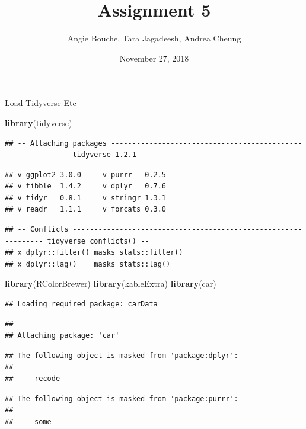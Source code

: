 \documentclass[]{article}
\title{Assignment 5}
\author{Angie Bouche, Tara Jagadeesh, Andrea Cheung}
\date{November 27, 2018}
\newenvironment{Shaded}{\begin{snugshade}}{\end{snugshade}}
\newcommand{\KeywordTok}[1]{\textcolor[rgb]{0.13,0.29,0.53}{\textbf{#1}}}
\newcommand{\NormalTok}[1]{#1}
\begin{document}
\maketitle

Load Tidyverse Etc

\begin{Shaded}
\begin{Highlighting}[]
\KeywordTok{library}\NormalTok{(tidyverse)}
\end{Highlighting}
\end{Shaded}

\begin{verbatim}
## -- Attaching packages ------------------------------------------------------------ tidyverse 1.2.1 --
\end{verbatim}

\begin{verbatim}
## v ggplot2 3.0.0     v purrr   0.2.5
## v tibble  1.4.2     v dplyr   0.7.6
## v tidyr   0.8.1     v stringr 1.3.1
## v readr   1.1.1     v forcats 0.3.0
\end{verbatim}

\begin{verbatim}
## -- Conflicts --------------------------------------------------------------- tidyverse_conflicts() --
## x dplyr::filter() masks stats::filter()
## x dplyr::lag()    masks stats::lag()
\end{verbatim}

\begin{Shaded}
\begin{Highlighting}[]
\KeywordTok{library}\NormalTok{(RColorBrewer)}
\KeywordTok{library}\NormalTok{(kableExtra)}
\KeywordTok{library}\NormalTok{(car)}
\end{Highlighting}
\end{Shaded}

\begin{verbatim}
## Loading required package: carData
\end{verbatim}

\begin{verbatim}
## 
## Attaching package: 'car'
\end{verbatim}

\begin{verbatim}
## The following object is masked from 'package:dplyr':
## 
##     recode
\end{verbatim}

\begin{verbatim}
## The following object is masked from 'package:purrr':
## 
##     some
\end{verbatim}
\end{document}
